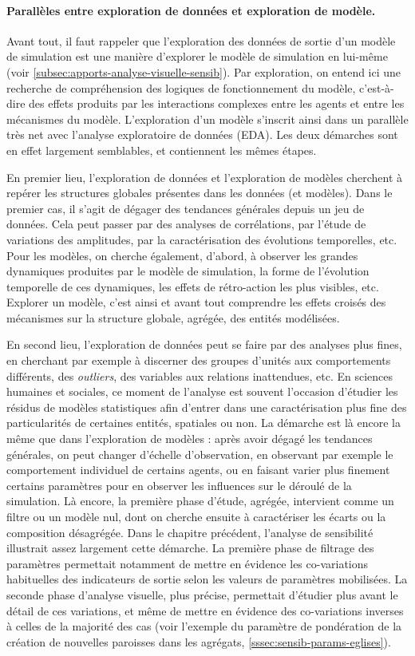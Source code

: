 \paragraph{Parallèles entre exploration de données et exploration de modèle.}
Avant tout, il faut rappeler que l'exploration des données de sortie d'un modèle de simulation est une manière d'explorer le modèle de simulation en lui-même (voir \cref{subsec:apports-analyse-visuelle-sensib}).
Par exploration, on entend ici une recherche de compréhension des logiques de fonctionnement du modèle, c'est-à-dire des effets produits par les interactions complexes entre les agents et entre les mécanismes du modèle.
L'exploration d'un modèle s'inscrit ainsi dans un parallèle très net avec l'analyse exploratoire de données (EDA).
Les deux démarches sont en effet largement semblables, et contiennent les mêmes étapes.

En premier lieu, l'exploration de données et l'exploration de modèles cherchent à repérer les structures globales présentes dans les données (et modèles).
Dans le premier cas, il s'agit de dégager des tendances générales depuis un jeu de données.
Cela peut passer par des analyses de corrélations, par l'étude de variations des amplitudes, par la caractérisation des évolutions temporelles, etc.
Pour les modèles, on cherche également, d'abord, à observer les grandes dynamiques produites par le modèle de simulation, la forme de l'évolution temporelle de ces dynamiques, les effets de rétro-action les plus visibles, etc.
Explorer un modèle, c'est ainsi et avant tout comprendre les effets croisés des mécanismes sur la structure globale, agrégée, des entités modélisées.

En second lieu, l'exploration de données peut se faire par des analyses plus fines, en cherchant par exemple à discerner des groupes d'unités aux comportements différents, des \textit{outliers}, des variables aux relations inattendues, etc.
En sciences humaines et sociales, ce moment de l'analyse est souvent l'occasion d'étudier les résidus de modèles statistiques afin d'entrer dans une caractérisation plus fine des particularités de certaines entités, spatiales ou non.
La démarche est là encore la même que dans l'exploration de modèles :
	après avoir dégagé les tendances générales, on peut changer d'échelle d'observation, en observant par exemple le comportement individuel de certains agents, ou en faisant varier plus finement certains paramètres pour en observer les influences sur le déroulé de la simulation.
Là encore, la première phase d'étude, agrégée, intervient comme un filtre ou un modèle nul, dont on cherche ensuite à caractériser les écarts ou la composition désagrégée.
Dans le chapitre précédent, l'analyse de sensibilité illustrait assez largement cette démarche.
La première phase de filtrage des paramètres permettait notamment de mettre en évidence les co-variations habituelles des indicateurs de sortie selon les valeurs de paramètres mobilisées.
La seconde phase d'analyse visuelle, plus précise, permettait d'étudier plus avant le détail de ces variations, et même de mettre en évidence des co-variations inverses à celles de la majorité des cas (voir l'exemple du paramètre de pondération de la création de nouvelles paroisses dans les agrégats, \cref{sssec:sensib-params-eglises}).


